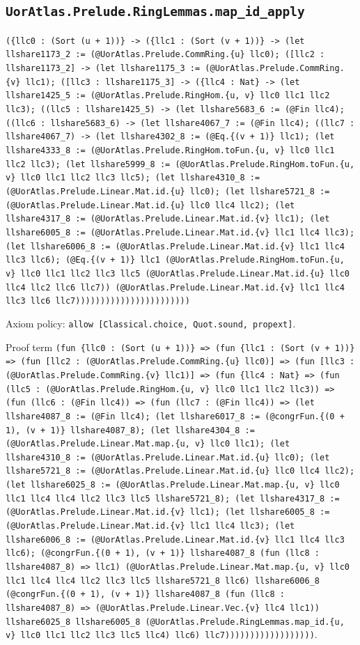 \documentclass[11pt]{article}
\begin{document}
\subsection*{\texttt{UorAtlas.Prelude.RingLemmas.map\_id\_apply}}
\noindent\texttt{(\{llc0 : (Sort (u + 1))\} -> (\{llc1 : (Sort (v + 1))\} -> (let llshare1173\_2 := (@UorAtlas.Prelude.CommRing.\{u\} llc0); ([llc2 : llshare1173\_2] -> (let llshare1175\_3 := (@UorAtlas.Prelude.CommRing.\{v\} llc1); ([llc3 : llshare1175\_3] -> (\{llc4 : Nat\} -> (let llshare1425\_5 := (@UorAtlas.Prelude.RingHom.\{u, v\} llc0 llc1 llc2 llc3); ((llc5 : llshare1425\_5) -> (let llshare5683\_6 := (@Fin llc4); ((llc6 : llshare5683\_6) -> (let llshare4067\_7 := (@Fin llc4); ((llc7 : llshare4067\_7) -> (let llshare4302\_8 := (@Eq.\{(v + 1)\} llc1); (let llshare4333\_8 := (@UorAtlas.Prelude.RingHom.toFun.\{u, v\} llc0 llc1 llc2 llc3); (let llshare5999\_8 := (@UorAtlas.Prelude.RingHom.toFun.\{u, v\} llc0 llc1 llc2 llc3 llc5); (let llshare4310\_8 := (@UorAtlas.Prelude.Linear.Mat.id.\{u\} llc0); (let llshare5721\_8 := (@UorAtlas.Prelude.Linear.Mat.id.\{u\} llc0 llc4 llc2); (let llshare4317\_8 := (@UorAtlas.Prelude.Linear.Mat.id.\{v\} llc1); (let llshare6005\_8 := (@UorAtlas.Prelude.Linear.Mat.id.\{v\} llc1 llc4 llc3); (let llshare6006\_8 := (@UorAtlas.Prelude.Linear.Mat.id.\{v\} llc1 llc4 llc3 llc6); (@Eq.\{(v + 1)\} llc1 (@UorAtlas.Prelude.RingHom.toFun.\{u, v\} llc0 llc1 llc2 llc3 llc5 (@UorAtlas.Prelude.Linear.Mat.id.\{u\} llc0 llc4 llc2 llc6 llc7)) (@UorAtlas.Prelude.Linear.Mat.id.\{v\} llc1 llc4 llc3 llc6 llc7)))))))))))))))))))))))}\par
\noindent Axiom policy: \texttt{allow [Classical.choice, Quot.sound, propext]}.\par
\noindent Proof term \texttt{(fun \{llc0 : (Sort (u + 1))\} => (fun \{llc1 : (Sort (v + 1))\} => (fun [llc2 : (@UorAtlas.Prelude.CommRing.\{u\} llc0)] => (fun [llc3 : (@UorAtlas.Prelude.CommRing.\{v\} llc1)] => (fun \{llc4 : Nat\} => (fun (llc5 : (@UorAtlas.Prelude.RingHom.\{u, v\} llc0 llc1 llc2 llc3)) => (fun (llc6 : (@Fin llc4)) => (fun (llc7 : (@Fin llc4)) => (let llshare4087\_8 := (@Fin llc4); (let llshare6017\_8 := (@congrFun.\{(0 + 1), (v + 1)\} llshare4087\_8); (let llshare4304\_8 := (@UorAtlas.Prelude.Linear.Mat.map.\{u, v\} llc0 llc1); (let llshare4310\_8 := (@UorAtlas.Prelude.Linear.Mat.id.\{u\} llc0); (let llshare5721\_8 := (@UorAtlas.Prelude.Linear.Mat.id.\{u\} llc0 llc4 llc2); (let llshare6025\_8 := (@UorAtlas.Prelude.Linear.Mat.map.\{u, v\} llc0 llc1 llc4 llc4 llc2 llc3 llc5 llshare5721\_8); (let llshare4317\_8 := (@UorAtlas.Prelude.Linear.Mat.id.\{v\} llc1); (let llshare6005\_8 := (@UorAtlas.Prelude.Linear.Mat.id.\{v\} llc1 llc4 llc3); (let llshare6006\_8 := (@UorAtlas.Prelude.Linear.Mat.id.\{v\} llc1 llc4 llc3 llc6); (@congrFun.\{(0 + 1), (v + 1)\} llshare4087\_8 (fun (llc8 : llshare4087\_8) => llc1) (@UorAtlas.Prelude.Linear.Mat.map.\{u, v\} llc0 llc1 llc4 llc4 llc2 llc3 llc5 llshare5721\_8 llc6) llshare6006\_8 (@congrFun.\{(0 + 1), (v + 1)\} llshare4087\_8 (fun (llc8 : llshare4087\_8) => (@UorAtlas.Prelude.Linear.Vec.\{v\} llc4 llc1)) llshare6025\_8 llshare6005\_8 (@UorAtlas.Prelude.RingLemmas.map\_id.\{u, v\} llc0 llc1 llc2 llc3 llc5 llc4) llc6) llc7))))))))))))))))))}.\par
\end{document}
